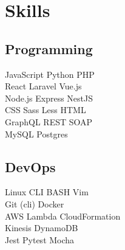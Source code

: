 \documentclass[]{pb-resume-openfonts}
\begin{document}
\begin{minipage}[t]{0.33\textwidth}

\section{Skills}
\subsection{Programming}
JavaScript \textbullet{}  Python \textbullet{}  PHP \textbullet{}  \\
React \textbullet{}  Laravel \textbullet{}  Vue.js \textbullet{} \\
Node.js \textbullet{}  Express \textbullet{} NestJS \\ 
CSS \textbullet{} Sass \textbullet{} Less \textbullet{} HTML \\
GraphQL \textbullet{} REST \textbullet{}  SOAP\textbullet{} \\
MySQL\textbullet{}  Postgres\textbullet{}  
\sectionsep

\subsection{DevOps}
Linux CLI \textbullet{}  BASH \textbullet{}  Vim\textbullet{}  \\
Git (cli) \textbullet{} Docker \\
AWS \textbullet{} Lambda \textbullet{} CloudFormation \textbullet{} \\
Kinesis \textbullet{} DynamoDB \textbullet{} \\
Jest \textbullet{} Pytest \textbullet{} Mocha \textbullet{}  
\sectionsep

%
%

\end{minipage} 
\hfill
\end{document}
